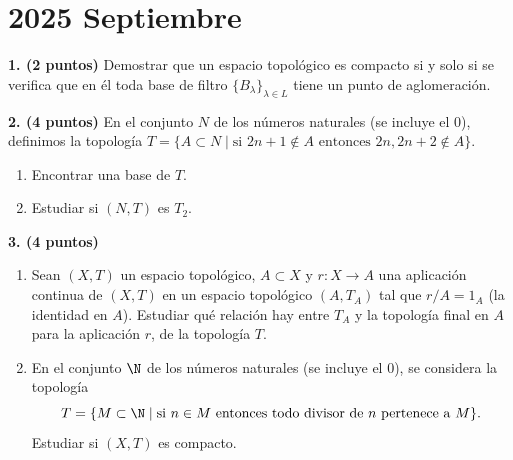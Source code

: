 \clearpage
\chapter*{2025 Septiembre}

\begin{enunciado}
    \hypertarget{2025 S 1}{}
    \textbf{1. (2 puntos)} Demostrar que un espacio topológico es compacto si y solo si se verifica que en él toda base de filtro \(\{B_\lambda\}_{\lambda \in L}\) tiene un punto de aglomeración.
\end{enunciado}

\begin{enunciado}
    \hypertarget{2025 S 2}{}
    \textbf{2. (4 puntos)} En el conjunto \(N\) de los números naturales (se incluye el 0), definimos la topología \(T = \{A \subset N \mid \text{si } 2n + 1 \notin A \text{ entonces } 2n, 2n + 2 \notin A\}\).
    \begin{enumerate}[label=\alph*)]
        \item Encontrar una base de \(T\).
        \item Estudiar si \((N,T)\) es \(T_2\).
    \end{enumerate}
\end{enunciado}

\begin{enunciado}
    \hypertarget{2025 S 3}{}
    \textbf{3. (4 puntos)}
    \begin{enumerate}[label=\alph*)]
        \item Sean \((X,T)\) un espacio topológico, \(A \subset X\) y \(r : X \to A\) una aplicación continua de \((X,T)\) en un espacio topológico \((A,T_A)\) tal que \(r/A = 1_A\) (la identidad en \(A\)). Estudiar qué relación hay entre \(T_A\) y la topología final en \(A\) para la aplicación \(r\), de la topología \(T\).
        \item En el conjunto \(\N\) de los números naturales (se incluye el 0), se considera la topología
        \[
            T = \{M \subset \N \mid \text{si } n \in M \text{ entonces todo divisor de } n \text{ pertenece a } M\}.
        \]
        Estudiar si \((X,T)\) es compacto.
    \end{enumerate}
\end{enunciado}